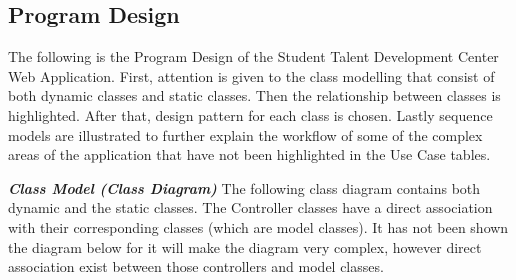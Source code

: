 \subsection{Program Design}
\begin{justify}
    The following is the Program Design of the Student Talent Development Center Web Application. First, attention is given to the class modelling that consist of both dynamic classes and static classes. Then the relationship between classes is highlighted. After that, design pattern for each class is chosen. Lastly sequence models are illustrated to further explain the workflow of some of the complex areas of the application that have not been highlighted in the Use Case tables.

\vspace{0.25cm}
\newendline \textbf{\textit{Class Model (Class Diagram)}}\newendline
The following class diagram contains both dynamic and the static classes. The Controller classes have a direct association with their corresponding classes (which are model classes). It has not been shown the diagram below for it will make the diagram very complex, however direct association exist between those controllers and model classes.


\end{justify}
